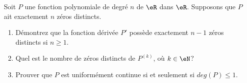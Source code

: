 
\begin{exercice}\label{exo0095}

Soit $P$ une fonction polynomiale de degré $n$ de $\eR$ dans $\eR$. Supposons que $P$ ait exactement $n$ zéros distincts.
\begin{enumerate}
\item
Démontrez que la fonction dérivée $P'$ possède exactement $n-1$ zéros distincts si $n \geq 1$.
\item
Quel est le nombre de zéros distincts de $P^{(k)}$, où $k\in \eN$?
\item
Prouver que $P$ est uniformément continue si et seulement si $deg(P)\leq1$.
\end{enumerate}

\end{exercice}
